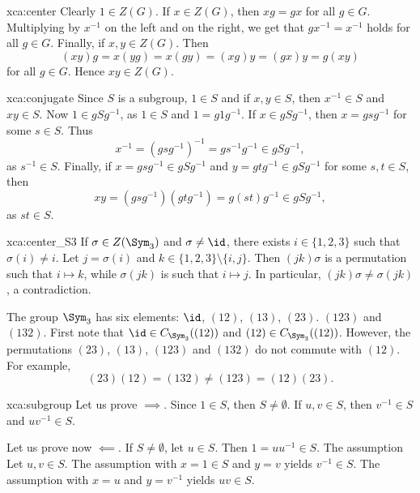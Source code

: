 \begin{sol}{xca:center}
    Clearly $1\in Z(G)$. If $x\in Z(G)$, then $xg=gx$ for all $g\in G$. Multiplying by $x^{-1}$ on the left and 
    on the right, we get that $gx^{-1}=x^{-1}$ holds for all $g\in G$. Finally, if $x,y\in Z(G)$. Then
    \[
    (xy)g=x(yg)=x(gy)=(xg)y=(gx)y=g(xy)
    \]
    for all $g\in G$. Hence $xy\in Z(G)$. 
\end{sol}


\begin{sol}{xca:conjugate}
    Since $S$ is a subgroup, $1\in S$ and 
    if $x,y\in S$, then $x^{-1}\in S$ and $xy\in S$. Now 
    $1\in gSg^{-1}$, as $1\in S$ and $1=g1g^{-1}$. If $x\in gSg^{-1}$, then 
    $x=gsg^{-1}$ for some $s\in S$. Thus 
    \[
    x^{-1}=(gsg^{-1})^{-1}=gs^{-1}g^{-1}\in gSg^{-1},
    \]
    as $s^{-1}\in S$. Finally, 
    if $x=gsg^{-1}\in gSg^{-1}$ and $y=gtg^{-1}\in gSg^{-1}$ for some $s,t\in S$, then 
    \[
    xy=(gsg^{-1})(gtg^{-1})=g(st)g^{-1}\in gSg^{-1},
    \]
    as $st\in S$. 
\end{sol}

\begin{sol}{xca:center_S3}
    If $\sigma\in Z(\Sym_3)$ and $\sigma\ne\id$, there exists $i\in\{1,2,3\}$ such that 
    $\sigma(i)\ne i$. Let $j=\sigma(i)$ and $k\in\{1,2,3\}\setminus\{i,j\}$. Then 
    $(jk)\sigma$ is a permutation such that $i\mapsto k$, while 
    $\sigma(jk)$ is such that $i\mapsto j$. In particular, $(jk)\sigma\ne\sigma(jk)$, a contradiction.

    The group $\Sym_3$ has six elements: $\id$, $(12)$, $(13)$, $(23)$. $(123)$ and $(132)$. 
    First note that $\id\in C_{\Sym_3}((12))$ and 
    $(12)\in C_{\Sym_3}((12))$. However, 
    the permutations $(23)$, $(13)$, $(123)$ and $(132)$ do not commute with
    $(12)$. For example, 
    \[
    (23)(12)=(132)\ne (123)=(12)(23).
    \]
\end{sol}

\begin{sol}{xca:subgroup}
    Let us prove $\implies$. Since $1\in S$, then $S\ne\emptyset$. If $u,v\in S$, then 
    $v^{-1}\in S$ and $uv^{-1}\in S$. 

    Let us prove now $\impliedby$. If $S\ne\emptyset$, let $u\in S$. Then $1=uu^{-1}\in S$. The assumption 
    Let $u,v\in S$. The assumption with $x=1\in S$ and $y=v$ yields $v^{-1}\in S$. The assumption 
    with $x=u$ and $y=v^{-1}$ yields $uv\in S$. 
\end{sol}

